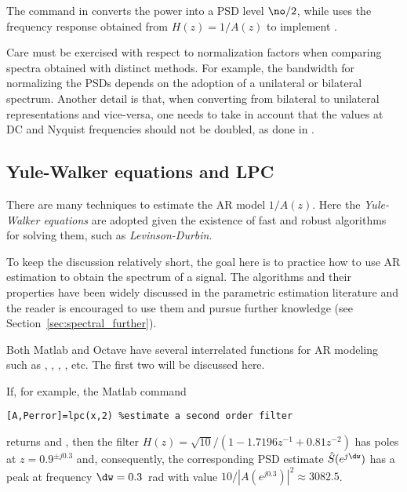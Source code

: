 
The command  in
 converts the power  into a PSD level $\no/2$, 
while  
 uses the frequency response  obtained from $H(z)=1/A(z)$ to implement .

Care must be exercised with respect to normalization factors when comparing spectra obtained with distinct methods. For example, the bandwidth for normalizing the PSDs depends on the adoption of a unilateral or bilateral spectrum. 
Another detail is that, when converting from bilateral to unilateral representations and vice-versa, one needs to take in account that the values at DC and Nyquist frequencies should not be doubled, as done in .

\subsection{{\akadvanced} Yule-Walker equations and LPC}

There are many techniques to estimate the AR model $1/A(z)$. Here the \emph{Yule-Walker equations} are adopted given the existence of fast and robust algorithms for solving them, such as  \emph{Levinson-Durbin}. 

To keep the discussion relatively short, the goal here is to practice how to use AR estimation to obtain the spectrum of a signal. The algorithms and their properties have been widely discussed in the parametric estimation literature and the reader is encouraged to use them and pursue further knowledge (see Section~\ref{sec:spectral_further}).

Both Matlab and Octave have several interrelated functions for AR modeling such as , , , , etc. The first two will be discussed here.

If, for example, the Matlab command
\begin{lstlisting}
[A,Perror]=lpc(x,2) %estimate a second order filter
\end{lstlisting}
returns  and , then the filter $H(z)=\sqrt{10}/(1-1.7196 z^{-1}+   0.81z^{-2})$ has poles at $z=0.9^{\pm j 0.3}$ and, consequently, the corresponding PSD estimate $\hat S(e^{j \dw})$ has a peak at frequency $\dw=0.3$~rad with value $10/|A(e^{j 0.3})|^2 \approx 3082.5$.

